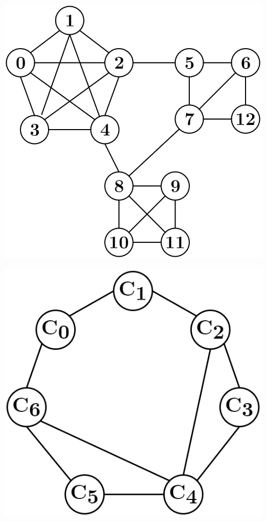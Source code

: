 \documentclass[10pt]{article}
\begin{document}
\begin{minipage}{\linewidth}
	\begin{minipage}{0.4\linewidth}
		\includegraphics[width=\linewidth]{../diagrams/graphs-Graph.png}
	\end{minipage}
	\hspace{5mm}
	\begin{minipage}{0.1\linewidth}
		
	\end{minipage}
	\hspace{5mm}
	\begin{minipage}{0.3\linewidth}
		\includegraphics[width=\linewidth]{../diagrams/graphs-Cliques.png}
	\end{minipage}
\end{minipage}

\vspace{5mm}



\vspace{5mm}


\end{document}
